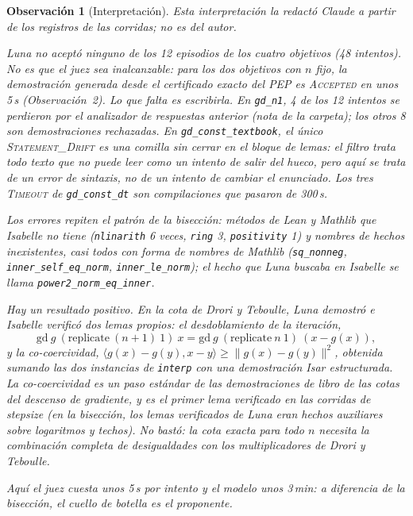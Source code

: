\documentclass[11pt,a4paper]{article}
\newtheorem{remark}{Observación}
\begin{document}
\begin{remark}[Interpretación]
Esta interpretación la redactó Claude a partir de los registros de las corridas; no es del autor.

Luna no aceptó ninguno de los 12 episodios de los cuatro objetivos (48 intentos). No es que el juez sea inalcanzable: para los dos objetivos con $n$ fijo, la demostración generada desde el certificado exacto del PEP es \textsc{Accepted} en unos 5\,s (Observación~2). Lo que falta es escribirla. En \texttt{gd\_n1}, 4 de los 12 intentos se perdieron por el analizador de respuestas anterior (nota de la carpeta); los otros 8 son demostraciones rechazadas. En \texttt{gd\_const\_textbook}, el único \textsc{Statement\_Drift} es una comilla sin cerrar en el bloque de lemas: el filtro trata todo texto que no puede leer como un intento de salir del hueco, pero aquí se trata de un error de sintaxis, no de un intento de cambiar el enunciado. Los tres \textsc{Timeout} de \texttt{gd\_const\_dt} son compilaciones que pasaron de 300\,s.

Los errores repiten el patrón de la bisección: métodos de Lean y Mathlib que Isabelle no tiene (\texttt{nlinarith} 6 veces, \texttt{ring} 3, \texttt{positivity} 1) y nombres de hechos inexistentes, casi todos con forma de nombres de Mathlib (\texttt{sq\_nonneg}, \texttt{inner\_self\_eq\_norm}, \texttt{inner\_le\_norm}); el hecho que Luna buscaba en Isabelle se llama \texttt{power2\_norm\_eq\_inner}.

Hay un resultado positivo. En la cota de Drori y Teboulle, Luna demostró e Isabelle verificó dos lemas propios: el desdoblamiento de la iteración,
\[ \mathrm{gd}\ g\ (\mathrm{replicate}\ (n+1)\ 1)\ x = \mathrm{gd}\ g\ (\mathrm{replicate}\ n\ 1)\ (x - g(x)), \] y la co-coercividad, $\langle g(x) - g(y), x - y\rangle \ge \|g(x) - g(y)\|^2$, obtenida sumando las dos instancias de \texttt{interp} con una demostración Isar estructurada. La co-coercividad es un paso estándar de las demostraciones de libro de las cotas del descenso de gradiente, y es el primer lema verificado en las corridas de stepsize (en la bisección, los lemas verificados de Luna eran hechos auxiliares sobre logaritmos y techos). No bastó: la cota exacta para todo $n$ necesita la combinación completa de desigualdades con los multiplicadores de Drori y Teboulle.

Aquí el juez cuesta unos 5\,s por intento y el modelo unos 3\,min: a diferencia de la bisección, el cuello de botella es el proponente.
\end{remark}


\end{document}
